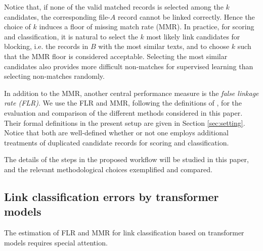 Notice that, if none of the valid matched records is selected among the $k$
candidates, the corresponding file-$A$ record cannot be linked correctly. Hence the
choice of $k$ induces a floor of missing match rate (MMR). In practice, for scoring
and classification, it is natural to select the $k$ most likely link candidates for
blocking, i.e. the records in $B$ with the most similar texts, and to choose $k$ such
that the MMR floor is considered acceptable. Selecting the most similar candidates
also provides more difficult non-matches for supervised learning than selecting
non-matches randomly.

In addition to the MMR, another central performance measure is the \emph{false linkage rate (FLR)}. We use the FLR and MMR, following the definitions of \citet{lee2021maximum}, for the evaluation and comparison of the different methods considered in this paper. Their formal definitions in the present setup are given in Section \ref{sec:setting}. Notice that both are well-defined whether or not one employs additional treatments of duplicated candidate records for scoring and classification.

The details of the steps in the proposed workflow will be studied in this paper, and the relevant methodological choices exemplified and compared.


 

\subsection{Link classification errors by transformer models}
\label{sec:literature:error}

The estimation of FLR and MMR for link classification based on transformer models requires special attention.



